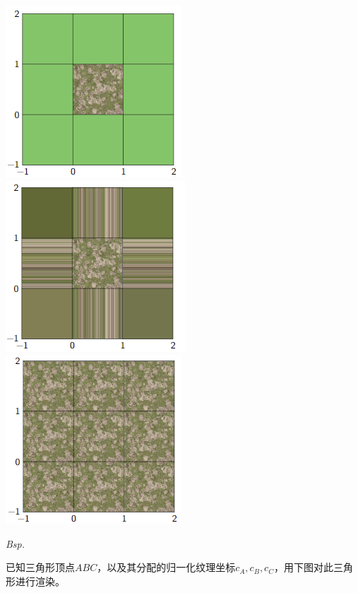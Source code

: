 \documentclass[fleqn]{article}
\begin{document}
\begin{center}
    \includegraphics[scale=0.5]{28.png}
    \includegraphics[scale=0.5]{29.png}
    \includegraphics[scale=0.5]{30.png}
\end{center}

\noindent\textit{Bsp.}

已知三角形顶点$ABC$，以及其分配的归一化纹理坐标$c_A,c_B,c_C$，用下图对此三角形进行渲染。
\end{document}
